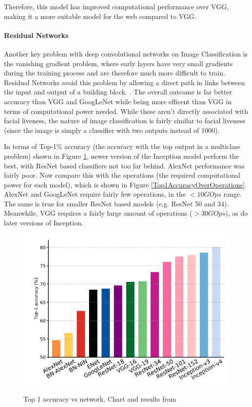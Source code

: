 \documentclass[10pt,a4paper]{article}
\begin{document}
        Therefore, this model has improved computational performance over VGG, making it a more suitable model for the web compared to VGG. \cite{DeepNeuralNetworkDeployability}
        
        \paragraph{Residual Networks}
        Another key problem with deep convolutional networks on Image Classification is the vanishing gradient problem, where early layers have very small gradients during the training process and
        are therefore much more difficult to train. Residual Networks avoid this problem by allowing a direct path in links between the input and output of a building block. .
        The overall outcome is far better accuracy than VGG and GoogLeNet while being more efficent than VGG in terms of computational power needed. 
        While these aren't directly associated with facial liveness, the nature of image classification is fairly similar to facial liveness (since the image is simply a classifier with two outputs instead of 1000).
        
        In terms of Top-1\% accuracy (the accuracy with the top output in a multiclass problem) shown in Figure \ref{Top1AccuracyOverNetwork}, newer version of the Inception model perform the best,
        with ResNet based classifiers not too far behind. AlexNet performance was fairly poor. Now compare this with the operations (the required computational power for each model), which is shown in Figure \ref{Top1AccuracyOverOperations}.
        AlexNet and GoogLeNet require fairly few operations, in the $<10 GOps$ range. The same is true for smaller ResNet based models (e.g. ResNet 50 and 34).
        Meanwhile, VGG requires a fairly large amount of operations ($>30 GOps$), as do later versions of Inception.


        \begin{figure}
            \centering
            \includegraphics[width=.7\linewidth]{Top1AccuracyOverNetwork.png}
            \label{Top1AccuracyOverNetwork}
            \caption{Top 1 accuracy vs network. Chart and results from \cite{DeepNeuralNetworkDeployability}}
        \end{figure}
\end{document}
